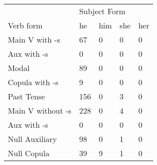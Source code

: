 \begin{table}[]
\begin{minipage}{0.5\textwidth}
\end{minipage}
\begin{minipage}{0.5\textwidth}
    \centering
    \begin{tabular}{@{}lllll@{}}
        \toprule
            &\multicolumn{4}{l}{Subject Form}\\
            \cline{2-5}
        Verb form & he & him & she & her \\
        \midrule
        Main V with -s & 67 & 0 & 0 & 0 \\
        Aux with -s & 0 & 0 & 0 & 0 \\
        Modal & 89 & 0 & 0 & 0 \\
        Copula with -s & 9 & 0 & 0 & 0 \\
        Past Tense & 156 & 0 & 3 & 0 \\
        \hline
        Main V without -s & 228 & 0 & 4 & 0 \\
        Aux with -s & 0 & 0 & 0 & 0 \\
        Null Auxiliary & 98 & 0 & 1 & 0 \\
        Null Copula & 39 & 9 & 1 & 0 \\
        \bottomrule
    \end{tabular}
    \end{minipage}
\end{table}
